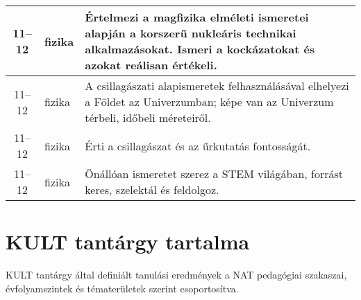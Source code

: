 \begin{small}
\begin{longtable}{c | p{2cm} |  p{11cm} }
              11--12 & fizika & Értelmezi a magfizika elméleti ismeretei alapján a korszerű nukleáris technikai alkalmazásokat. Ismeri a kockázatokat és azokat reálisan értékeli. \\ \hline
              11--12 & fizika & A csillagászati alapismeretek felhasználásával elhelyezi a Földet az Univerzumban; képe van  az Univerzum térbeli, időbeli méreteiről. \\ \hline
              11--12 & fizika & Érti a csillagászat és az űrkutatás fontosságát. \\ \hline
              11--12 & fizika & Önállóan ismeretet szerez a STEM világában, forrást keres, szelektál és feldolgoz. \\ \hline
      \end{longtable}
\end{small}




\section{KULT tantárgy tartalma }
KULT tantárgy által definiált tanulási eredmények a NAT pedagógiai szakaszai, évfolyamszintek és tématerületek szerint csoportosítva.

